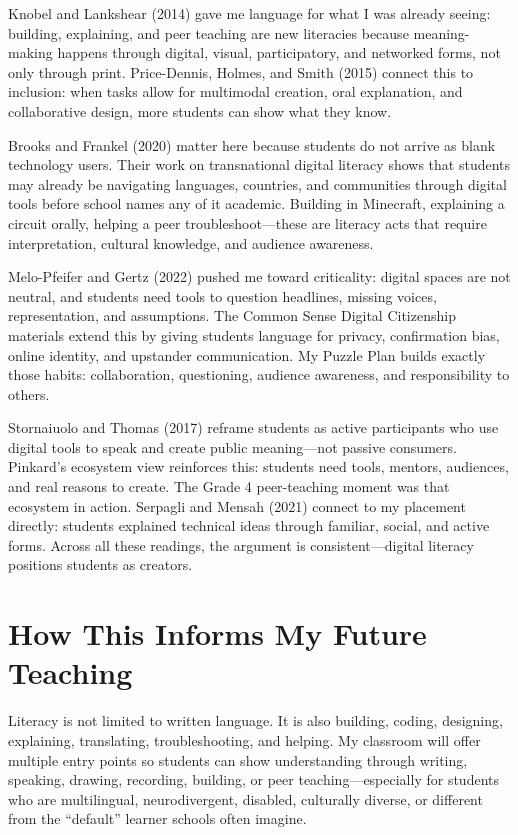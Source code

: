 \documentclass[11pt]{article}
\begin{document}
Knobel and Lankshear (2014) gave me language for what I was already seeing: building, explaining, and peer teaching are new literacies because meaning-making happens through digital, visual, participatory, and networked forms, not only through print. Price-Dennis, Holmes, and Smith (2015) connect this to inclusion: when tasks allow for multimodal creation, oral explanation, and collaborative design, more students can show what they know.

Brooks and Frankel (2020) matter here because students do not arrive as blank technology users. Their work on transnational digital literacy shows that students may already be navigating languages, countries, and communities through digital tools before school names any of it academic. Building in Minecraft, explaining a circuit orally, helping a peer troubleshoot---these are literacy acts that require interpretation, cultural knowledge, and audience awareness.

Melo-Pfeifer and Gertz (2022) pushed me toward criticality: digital spaces are not neutral, and students need tools to question headlines, missing voices, representation, and assumptions. The Common Sense Digital Citizenship materials extend this by giving students language for privacy, confirmation bias, online identity, and upstander communication. My Puzzle Plan builds exactly those habits: collaboration, questioning, audience awareness, and responsibility to others.

Stornaiuolo and Thomas (2017) reframe students as active participants who use digital tools to speak and create public meaning---not passive consumers. Pinkard's ecosystem view reinforces this: students need tools, mentors, audiences, and real reasons to create. The Grade 4 peer-teaching moment was that ecosystem in action. Serpagli and Mensah (2021) connect to my placement directly: students explained technical ideas through familiar, social, and active forms. Across all these readings, the argument is consistent---digital literacy positions students as creators.

\section*{How This Informs My Future Teaching}

Literacy is not limited to written language. It is also building, coding, designing, explaining, translating, troubleshooting, and helping. My classroom will offer multiple entry points so students can show understanding through writing, speaking, drawing, recording, building, or peer teaching---especially for students who are multilingual, neurodivergent, disabled, culturally diverse, or different from the ``default'' learner schools often imagine.
\end{document}

